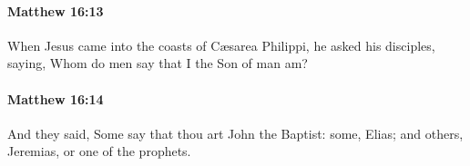 		\paragraph{Matthew 16:13} %
			\label{MATTHEW-16-13}

			When Jesus came into the coasts of Cæsarea Philippi, he asked his disciples, saying, Whom do men say that I the Son of man am?

			\begin{framed}
			\scriptsize
				\begin{compactdesc}
					\item[SBLG] 
				\end{compactdesc}
			\end{framed}

		\paragraph{Matthew 16:14} %
			\label{MATTHEW-16-14}

			And they said, Some say that thou art John the Baptist: some, Elias; and others, Jeremias, or one of the prophets.


